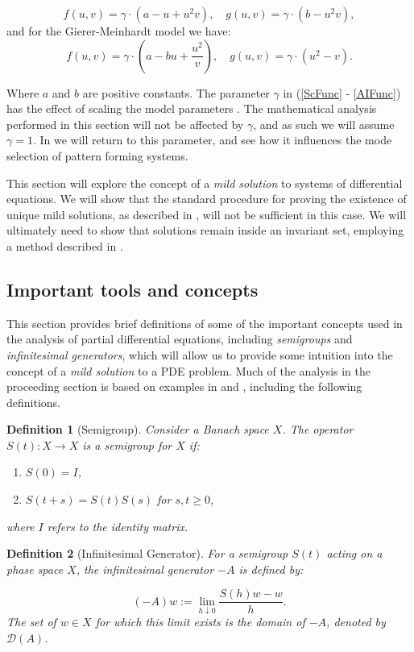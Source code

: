\documentclass[12pt]{article}
\newtheorem{definition}{Definition}[section]
\begin{document}
\begin{equation} \label{ScFunc}
f(u,v) = \gamma \cdot (a-u+u^2v), \quad g(u,v) = \gamma \cdot (b-u^2v),
\end{equation}
and for the Gierer-Meinhardt model \cite{Meinhardt} we have:
\begin{equation} \label{AIFunc}
f(u,v) = \gamma \cdot (a-bu+\frac{u^2}{v}), \quad g(u,v) = \gamma \cdot (u^2 - v).
\end{equation}

Where $a$ and $b$ are positive constants. The parameter $\gamma$ in (\ref{ScFunc} - \ref{AIFunc}) has the effect of scaling the model parameters \cite{Murray}. The mathematical analysis performed in this section will not be affected by $\gamma$, and as such we will assume $\gamma = 1$. In  we will return to this parameter, and see how it influences the mode selection of pattern forming systems. 

This section will explore the concept of a \textit{mild solution} to systems of differential equations. We will show that the standard procedure for proving the existence of unique mild solutions, as described in \cite{Lord}, will not be sufficient in this case. We will ultimately need to show that solutions remain inside an invariant set, employing a method described in \cite{Smoller}. 

\subsection{Important tools and concepts}
This section provides brief definitions of some of the important concepts used in the analysis of partial differential equations, including \textit{semigroups} and \textit{infinitesimal generators}, which will allow us to provide some intuition into the concept of a \textit{mild solution} to a PDE problem. Much of the analysis in the proceeding section is based on examples in \cite{Lord} and \cite{Pazy}, including the following definitions.

\begin{definition}[Semigroup] \label{SGprop} \cite{Lord, Pazy}
Consider a Banach space $X$. The operator $S(t):X\to X$ is a semigroup for $X$ if:
\begin{enumerate}
\item[(i)] $S(0) = I$,
\item[(ii)] $S(t+s) = S(t)S(s)$ for $s,t \geq 0$,
\end{enumerate}
where $I$ refers to the identity matrix.  
\end{definition}
\begin{definition}[Infinitesimal Generator] \cite{Lord, Pazy} \label{IGprop}
For a semigroup $S(t)$ acting on a phase space $X$, the infinitesimal generator $-A$ is defined by:

$$(-A)w:=\lim_{h \downarrow 0} \frac{S(h)w - w}{h}.$$
The set of $w \in X$ for which this limit exists is the domain of $-A$, denoted by $\mathcal{D}(A)$. 
\end{definition}
\end{document}
